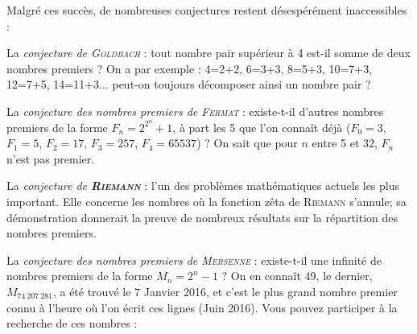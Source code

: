 \begin{His}
Malgré ces succès, de nombreuses conjectures restent désespérément
inaccessibles :

\begin{description}[leftmargin=*]
\item[•] La {\em conjecture de \textsc{Goldbach}} : tout nombre pair supérieur à 4 est-il
somme de deux nombres premiers ? On a par exemple : 4=2+2, 6=3+3, 8=5+3, 
10=7+3, 12=7+5, 14=11+3... peut-on toujours décomposer ainsi un nombre pair ?
\item[•] La {\em conjecture des nombres premiers de \textsc{Fermat}} : existe-t-il d'autres
nombres premiers de la forme $F_n=2^{2^n}+1$, à part les 5 que l'on connaît
déjà ($F_0=3$, $F_1=5$, $F_2=17$, $F_3=257$, $F_4=65537$) ? On sait que
pour $n$ entre 5 et 32, $F_n$ n'est pas premier.
\item[•] La {\em conjecture de \textsc{\textbf{Riemann}}} : l'un des problèmes mathématiques actuels
les plus important. Elle concerne les nombres où la fonction zêta de
\textsc{Riemann} s'annule; sa démonstration donnerait la preuve de nombreux
résultats sur la répartition des nombres premiers.  
\item[•] La {\em conjecture des nombres premiers de \textsc{Mersenne}} : existe-t-il une
infinité de nombres premiers de la forme $M_n=2^n-1$ ? On en connaît
49, le dernier, $M_{74~207~281}$, a été trouvé le 7 Janvier 2016, et
c'est le plus grand nombre premier connu à l'heure où l'on écrit
ces lignes (Juin 2016). Vous pouvez participer à la recherche
de ces nombres : 


\end{description}




\end{His}

